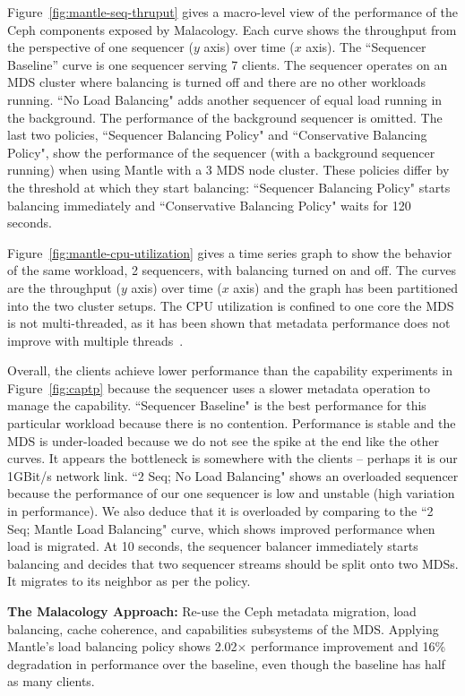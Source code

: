 \documentclass[preprint]{sigplanconf-eurosys}
\begin{document}
Figure~\ref{fig:mantle-seq-thruput} gives a macro-level view of the performance
of the Ceph components exposed by Malacology. Each curve shows the throughput
from the perspective of one sequencer (\(y\) axis) over time (\(x\) axis).  The
``Sequencer Baseline'' curve is one sequencer serving 7 clients.  The sequencer
operates on an MDS cluster where balancing is turned off and there are no other
workloads running. ``No Load Balancing" adds another sequencer of equal load
running in the background. The performance of the background sequencer is
omitted. The last two policies, ``Sequencer Balancing Policy" and
``Conservative Balancing Policy", show the performance of the sequencer (with a
background sequencer running) when using Mantle with a 3 MDS node cluster.
These policies differ by the threshold at which they start balancing:
``Sequencer Balancing Policy" starts balancing immediately and ``Conservative
Balancing Policy" waits for 120 seconds.

Figure~\ref{fig:mantle-cpu-utilization} gives a time series graph to show the
behavior of the same workload, 2 sequencers, with balancing turned on and off.
The curves are the throughput (\(y\) axis) over time (\(x\) axis) and the graph
has been partitioned into the two cluster setups. The CPU utilization is
confined to one core the MDS is not multi-threaded, as it has been shown that
metadata performance does not improve with multiple
threads~\cite{konstantinos:pdsw2014-lustre-metadata}. 

Overall, the clients achieve lower performance than the capability experiments
in Figure~\ref{fig:captp} because the sequencer uses a slower metadata
operation to manage the capability.  ``Sequencer Baseline" is the best
performance for this particular workload because there is no contention.
Performance is stable and the MDS is under-loaded because we do not see the
spike at the end like the other curves. It appears the bottleneck is somewhere
with the clients -- perhaps it is our 1GBit/s network link. ``2 Seq; No Load
Balancing" shows an overloaded sequencer because the performance of our one
sequencer is low and unstable (high variation in performance). We also deduce
that it is overloaded by comparing to the ``2 Seq; Mantle Load Balancing"
curve, which shows improved performance when load is migrated. At 10 seconds,
the sequencer balancer immediately starts balancing and decides that two
sequencer streams should be split onto two MDSs. It migrates to its neighbor as
per the policy. 

\textbf{The Malacology Approach:} Re-use the Ceph metadata migration, load
balancing, cache coherence, and capabilities subsystems of the MDS. Applying
Mantle's load balancing policy shows 2.02\(\times\) performance improvement and
16\% degradation in performance over the baseline, even though the baseline has
half as many clients.
\end{document}
